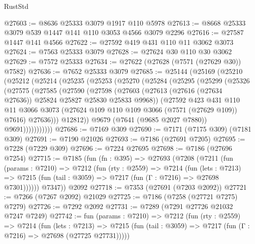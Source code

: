\begin{lexlean}{RustStd}
\begin{coremodule}
{\begin{coremodule}
{{{{{{{{{{{{{{{{{{{{{{{{{{{{{{{{@27603 := @8636 @25333 @3079 @1917 @110 @5978
@27613 := @8668 @25333 @3079 @539 @1447 @141 @110 @3053 @4566 @3079 @2296
@27616 := @27587 @1447 @141 @4566
@27622 := @27592 @419 @431 @110 @11 @3062 @3073
@27624 := @7563 @25333 @3079
@27628 := @27624 @30 @110 @30 @3062
@27629 := @7572 @25333
@27634 := @27622 (@27628 (@7571 (@27629 @30)) @7582)
@27636 := @7652 @25333 @3079
@27685 := @25144
    (@25169
      (@25210
        (@25212
          (@25214
            (@25235
              (@25253
                (@25270
                  (@25284
                    (@25295
                      (@25299
                        (@25326
                          (@27575
                            (@27585
                              (@27590
                                (@27598
                                  (@27603
                                    (@27613
                                      (@27616 (@27634 @27636))
                                      @25824
                                      @25827
                                      @25830
                                      @25833
                                      @9968))
                                  (@27592
                                    @423
                                    @431
                                    @110
                                    @11
                                    @3066
                                    @3073
                                    (@27624 @109 @110 @109 @3066 (@7571 (@27629 @109)) @7616)
                                    @27636)))
                              @12812))
                          @9679
                          (@7641 (@9685 @2027 @7880))
                          @9691)))))))))))
@27686 := @7169 @309
@27690 := @7171 (@7175 @309) (@7181 @309)
@27691 := @7190 @21026
@27693 := @7186 (@27691 @7205)
@27695 := @7228 (@7229 @309)
@27696 := @7224 @27695
@27698 := @7186 (@27696 @7254)
@27715 := @7185
    (fun (fn : @395) =>
    @27693
      (@7208
        (@7211
          (fun (params : @7210) =>
          @7212
            (fun (rty : @2559) =>
            @7214
              (fun (lets : @7213) =>
              @7215 (fun (tail : @3059) => @7217 (fun (Γ : @7216) => @27698 @7301))))))
        @7347))
    @2092
@27718 := @7353 (@27691 (@7203 @2092))
@27721 := @7266 (@7267 @2092) @21029
@27725 := @7186 (@7258 (@27721 @7275) @7279)
@27726 := @7292 @2092
@27731 := @7289 (@7291 @27726 @21032 @7247 @7249)
@27742 := fun (params : @7210) =>
  @7212
    (fun (rty : @2559) =>
    @7214
      (fun (lets : @7213) =>
      @7215 (fun (tail : @3059) => @7217 (fun (Γ : @7216) => @27698 (@27725 @27731)))))
}}}}}}}}}}}}}}}}}}}}}}}}}}}}}}}}
\end{coremodule}}
\end{coremodule}
\end{lexlean}
